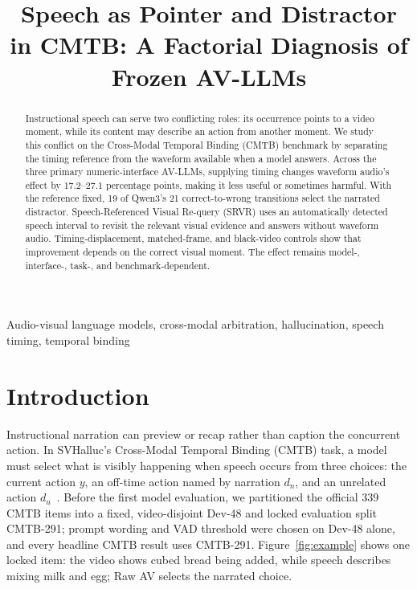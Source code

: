 
\title{Speech as Pointer and Distractor in CMTB: A Factorial Diagnosis of Frozen AV-LLMs}

\begin{abstract}
Instructional speech can serve two conflicting roles: its occurrence points to a video moment, while its content may describe an action from another moment. We study this conflict on the Cross-Modal Temporal Binding (CMTB) benchmark by separating the timing reference from the waveform available when a model answers. Across the three primary numeric-interface AV-LLMs, supplying timing changes waveform audio's effect by $17.2$--$27.1$ percentage points, making it less useful or sometimes harmful. With the reference fixed, 19 of Qwen3's 21 correct-to-wrong transitions select the narrated distractor. Speech-Referenced Visual Re-query (SRVR) uses an automatically detected speech interval to revisit the relevant visual evidence and answers without waveform audio. Timing-displacement, matched-frame, and black-video controls show that improvement depends on the correct visual moment. The effect remains model-, interface-, task-, and benchmark-dependent.
\end{abstract}

\begin{keywords}
Audio-visual language models, cross-modal arbitration, hallucination, speech timing, temporal binding
\end{keywords}

\section{Introduction}
\label{sec:introduction}

Instructional narration can preview or recap rather than caption the concurrent action. In SVHalluc's Cross-Modal Temporal Binding (CMTB) task, a model must select what is visibly happening when speech occurs from three choices: the current action $y$, an off-time action named by narration $d_n$, and an unrelated action $d_u$~\cite{zhang2026svhalluc}. Before the first model evaluation, we partitioned the official 339 CMTB items into a fixed, video-disjoint Dev-48 and locked evaluation split CMTB-291; prompt wording and VAD threshold were chosen on Dev-48 alone, and every headline CMTB result uses CMTB-291. Figure~\ref{fig:example} shows one locked item: the video shows cubed bread being added, while speech describes mixing milk and egg; Raw AV selects the narrated choice.

